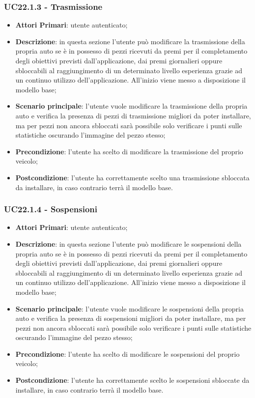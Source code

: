\subsubsection{UC22.1.3 - Trasmissione}
\begin{itemize}
	\item \textbf{Attori Primari}: utente autenticato;
	\item \textbf{Descrizione}: in questa sezione l'utente può modificare la trasmissione della propria auto se è in possesso di pezzi ricevuti da premi per il completamento degli obiettivi previsti dall'applicazione, dai premi giornalieri oppure sbloccabili al raggiungimento di un determinato livello esperienza grazie ad un continuo utilizzo dell'applicazione.
	All'inizio viene messo a disposizione il modello base;
	\item \textbf{Scenario principale}: l'utente vuole modificare la trasmissione della propria auto e verifica la presenza di pezzi di trasmissione migliori da poter installare, ma per pezzi non ancora sbloccati sarà possibile solo verificare i punti sulle statistiche oscurando l'immagine del pezzo stesso;
	\item \textbf{Precondizione}: l'utente ha scelto di modificare la trasmissione del proprio veicolo; 
	\item \textbf{Postcondizione}: l'utente ha correttamente scelto una trasmissione sbloccata da installare, in caso contrario terrà il modello base.
\end{itemize}
\subsubsection{UC22.1.4 - Sospensioni}
\begin{itemize}
	\item \textbf{Attori Primari}: utente autenticato;
	\item \textbf{Descrizione}: in questa sezione l'utente può modificare le sospensioni della propria auto se è in possesso di pezzi ricevuti da premi per il completamento degli obiettivi previsti dall'applicazione, dai premi giornalieri oppure sbloccabili al raggiungimento di un determinato livello esperienza grazie ad un continuo utilizzo dell'applicazione.
	All'inizio viene messo a disposizione il modello base;
	\item \textbf{Scenario principale}: l'utente vuole modificare le sospensioni della propria auto e verifica la presenza di sospensioni migliori da poter installare, ma per pezzi non ancora sbloccati sarà possibile solo verificare i punti sulle statistiche oscurando l'immagine del pezzo stesso;
	\item \textbf{Precondizione}: l'utente ha scelto di modificare le sospensioni del proprio veicolo; 
	\item \textbf{Postcondizione}: l'utente ha correttamente scelto le sospensioni sbloccate da installare, in caso contrario terrà il modello base.
\end{itemize}
